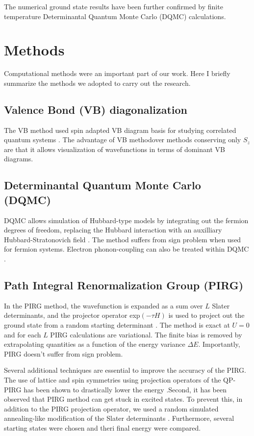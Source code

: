 \documentclass[a4paper,12pt]{article}
\begin{document}
The numerical ground state results have been further confirmed by finite temperature Determinantal Quantum
Monte Carlo (DQMC) calculations. 


\section{Methods}
Computational methods were an important part of our work. Here I briefly summarize  the methods we adopted to carry out 
the research. 

\subsection{Valence Bond (VB) diagonalization}
The VB method used spin adapted VB diagram basis for studying correlated quantum systems \cite{ramashesha84a,ramashesha84b,ramashesha86a}. 
The advantage of VB methodover methods conserving only $S_{z}$ are that it allows visualization of wavefunctions in terms of dominant VB diagrams. 

\subsection{Determinantal Quantum Monte Carlo (DQMC)}
DQMC allows simulation of Hubbard-type models by integrating out the fermion degrees of freedom, replacing the Hubbard interaction
with an auxilliary Hubbard-Stratonovich field \cite{loh92a,blankenbecler81a}. The method suffers from sign problem when used for 
fermion systems. Electron phonon-coupling can also be treated within DQMC \cite{johnston13a}. 

\subsection{Path Integral Renormalization Group (PIRG)}
In the PIRG method, the wavefunction is expanded as a sum over $L$ Slater determinants, and the projector operator exp$(-\tau H)$
is used to project out the ground state from a random starting determinant \cite{kashima01b}. The method is exact at $U=0$ and for each 
$L$ PIRG calculations are variational. The finite bias is removed by extrapolating quantities as a function of the energy variance $\Delta E$.
Importantly, PIRG doesn't suffer from sign problem.

Several additional techniques are essential to improve the accuracy of the PIRG. The use of lattice and spin symmetries using projection 
operators of the QP-PIRG has been shown to drastically lower the energy \cite{mizusaki06a}.Second, it has been observed that PIRG method can get 
stuck in excited states. To prevent this, in addition to the PIRG projection operator, we used a random simulated annealing-like modification
of the Slater determinants \cite{sahebsara06a}. Furthermore, several starting states were chosen and theri final energy were compared.
\end{document}
